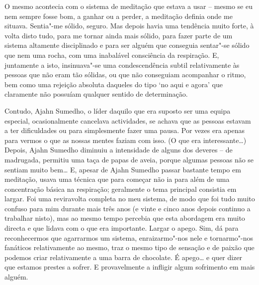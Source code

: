 O mesmo acontecia com o sistema de meditação que estava a usar -- mesmo se eu
nem sempre fosse bom, a ganhar ou a perder, a meditação definia onde me situava.
Sentia"-me sólido, seguro. Mas depois havia uma tendência muito forte, à volta
disto tudo, para me tornar ainda mais sólido, para fazer parte de um sistema
altamente disciplinado e para ser alguém que conseguia sentar"-se sólido que nem
uma rocha, com uma inabalável consciência da respiração. E, juntamente a isto,
insinuava"-se uma condescendência subtil relativamente às pessoas que não eram
tão sólidas, ou que não conseguiam acompanhar o ritmo, bem como uma rejeição
absoluta daqueles do tipo `no aqui e agora' que claramente não possuíam qualquer
sentido de determinação.

Contudo, Ajahn Sumedho, o líder daquilo que era suposto ser uma equipa especial,
ocasionalmente cancelava actividades, se achava que as pessoas estavam a ter
dificuldades ou para simplesmente fazer uma pausa. Por vezes era apenas para
vermos o que as nossas mentes faziam com isso. (O que era interessante\ldots{})
Depois, Ajahn Sumedho diminuiu a intensidade de alguns dos deveres -- de
madrugada, permitiu uma taça de papas de aveia, porque algumas pessoas não se
sentiam muito bem\ldots{} E, apesar de Ajahn Sumedho passar bastante tempo em
meditação, usava uma técnica que para começar não ia para além de uma
concentração básica na respiração; geralmente o tema principal consistia em
largar. Foi uma reviravolta completa no meu sistema, de modo que foi tudo muito
confuso para mim durante mais três anos (e vinte e cinco anos depois continuo a
trabalhar nisto), mas ao mesmo tempo percebia que esta abordagem era muito
directa e que lidava com o que era importante. Largar o apego. Sim, dá para
reconhecermos que agarrarmos um sistema, enraizarmo"-nos nele e tornarmo"-nos
fanáticos relativamente ao mesmo, traz o mesmo tipo de sensação e de paixão que
podemos criar relativamente a uma barra de chocolate. É apego\ldots{} e quer
dizer que estamos prestes a sofrer. E provavelmente a infligir algum sofrimento
em mais alguém.

